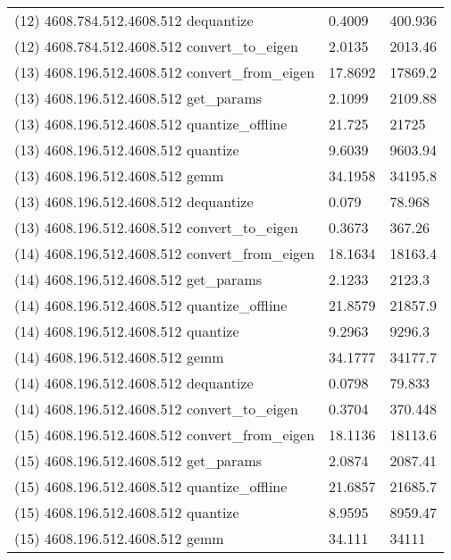 \begin{longtable}{lll}
(12) 4608.784.512.4608.512 dequantize            & 0.4009         & 400.936          \\
(12) 4608.784.512.4608.512 convert\_to\_eigen    & 2.0135         & 2013.46          \\
(13) 4608.196.512.4608.512 convert\_from\_eigen  & 17.8692        & 17869.2          \\
(13) 4608.196.512.4608.512 get\_params           & 2.1099         & 2109.88          \\
(13) 4608.196.512.4608.512 quantize\_offline     & 21.725         & 21725            \\
(13) 4608.196.512.4608.512 quantize              & 9.6039         & 9603.94          \\
(13) 4608.196.512.4608.512 gemm                  & 34.1958        & 34195.8          \\
(13) 4608.196.512.4608.512 dequantize            & 0.079          & 78.968           \\
(13) 4608.196.512.4608.512 convert\_to\_eigen    & 0.3673         & 367.26           \\
(14) 4608.196.512.4608.512 convert\_from\_eigen  & 18.1634        & 18163.4          \\
(14) 4608.196.512.4608.512 get\_params           & 2.1233         & 2123.3           \\
(14) 4608.196.512.4608.512 quantize\_offline     & 21.8579        & 21857.9          \\
(14) 4608.196.512.4608.512 quantize              & 9.2963         & 9296.3           \\
(14) 4608.196.512.4608.512 gemm                  & 34.1777        & 34177.7          \\
(14) 4608.196.512.4608.512 dequantize            & 0.0798         & 79.833           \\
(14) 4608.196.512.4608.512 convert\_to\_eigen    & 0.3704         & 370.448          \\
(15) 4608.196.512.4608.512 convert\_from\_eigen  & 18.1136        & 18113.6          \\
(15) 4608.196.512.4608.512 get\_params           & 2.0874         & 2087.41          \\
(15) 4608.196.512.4608.512 quantize\_offline     & 21.6857        & 21685.7          \\
(15) 4608.196.512.4608.512 quantize              & 8.9595         & 8959.47          \\
(15) 4608.196.512.4608.512 gemm                  & 34.111         & 34111            \\

\end{longtable}
